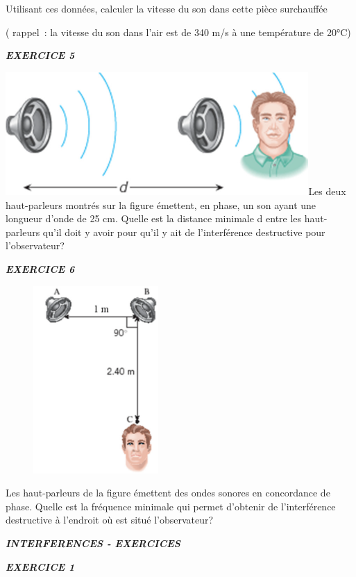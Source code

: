 Utilisant ces données, calculer la vitesse du son dans cette pièce
surchauffée

( rappel~: la vitesse du son dans l'air est de 340 m/s à une température
de 20°C)

\emph{\textbf{EXERCICE 5}}

\includegraphics[width=11.546cm,height=4.688cm]{Pictures/1000000100000363000001603D3E7105AB252F90.png}Les
deux haut-parleurs montrés sur la figure émettent, en phase, un son
ayant une longueur d'onde de 25 cm. Quelle est la distance minimale d
entre les haut-parleurs qu'il doit y avoir pour qu'il y ait de
l'interférence destructive pour l'observateur?

\emph{\textbf{EXERCICE 6}}

\begin{figure}
\centering
\includegraphics[width=4.757cm,height=7.147cm]{Pictures/10000001000001BA00000298E2F6E319C348E061.png}
\caption{}
\end{figure}

Les haut-parleurs de la figure émettent des ondes sonores en concordance
de phase. Quelle est la fréquence minimale qui permet d'obtenir de
l'interférence destructive à l'endroit où est situé l'observateur?

\emph{\textbf{INTERFERENCES - EXERCICES}}

\emph{\textbf{EXERCICE 1}}


